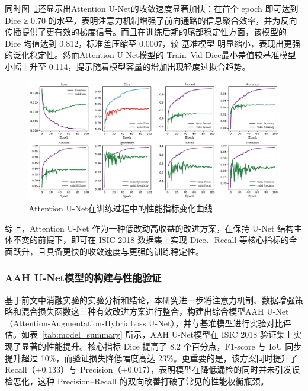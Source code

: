 同时图~\ref{fig:attunet}还显示出Attention U-Net的收敛速度显著加快：在首个 epoch 即可达到 Dice ≥ 0.70 的水平，表明注意力机制增强了前向通路的信息聚合效率，并为反向传播提供了更有效的梯度信号。而且在训练后期的尾部稳定性方面，该模型的 Dice 均值达到 0.812，标准差压缩至 0.0007，较 基准模型 明显缩小，表现出更强的泛化稳定性。然而Attention U-Net模型的 Train–Val Dice最小差值较基准模型小幅上升至 0.114，提示随着模型容量的增加出现轻度过拟合趋势。

\begin{figure}[!htbp]
    \centering
    \includegraphics[width=\textwidth]{fig/attunet_metrics.pdf}
    \caption{Attention U-Net在训练过程中的性能指标变化曲线}
    \label{fig:attunet}
\end{figure}

综上，Attention U-Net 作为一种低改动高收益的改进方案，在保持 U-Net 结构主体不变的前提下，即可在 ISIC 2018 数据集上实现 Dice、Recall 等核心指标的全面跃升，且具备更快的收敛速度与更强的训练稳定性。

\subsubsection{AAH U-Net模型的构建与性能验证}

基于前文中消融实验的实验分析和结论，本研究进一步将注意力机制、数据增强策略和混合损失函数这三种有效改进方案进行整合，构建出综合模型AAH U-Net（Attention-Augmentation-HybridLoss U-Net），并与基准模型进行实验对比评估。如表~\ref{tab:model_summary} 所示，AAH U-Net模型在 ISIC 2018 验证集上实现了显著的性能提升。核心指标 Dice 提高了 8.2 个百分点，F1-score 与 IoU 同步提升超过 10\%，而验证损失降低幅度高达 23\%。更重要的是，该方案同时提升了 Recall（+0.133）与 Precision（+0.017），表明模型在降低漏检的同时并未引发误检恶化，这种 Precision–Recall 的双向改善打破了常见的性能权衡瓶颈。

